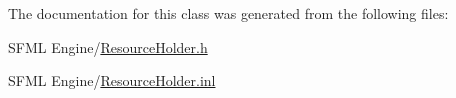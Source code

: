 The documentation for this class was generated from the following files\+:\begin{DoxyCompactItemize}
\item 
S\+F\+M\+L Engine/\hyperlink{_resource_holder_8h}{Resource\+Holder.\+h}\item 
S\+F\+M\+L Engine/\hyperlink{_resource_holder_8inl}{Resource\+Holder.\+inl}\end{DoxyCompactItemize}
